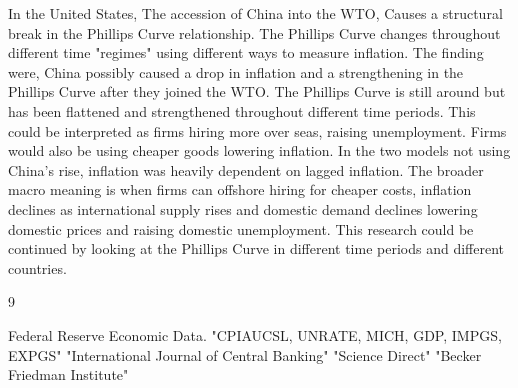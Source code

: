 \documentclass{article}
\begin{document}
In the United States, The accession of China into the WTO, Causes a structural break in the Phillips Curve relationship. The Phillips Curve changes throughout different time "regimes" using different ways to measure inflation. The finding were, China possibly caused a drop in inflation and a strengthening in the Phillips Curve after they joined the WTO. The Phillips Curve is still around but has been flattened and strengthened throughout different time periods. This could be interpreted as firms hiring more over seas, raising unemployment. Firms would also be using cheaper goods lowering inflation. In the two models not using China's rise, inflation was heavily dependent on lagged inflation. The broader macro meaning is when firms can offshore hiring for cheaper costs, inflation declines as international supply rises and domestic demand declines lowering domestic prices and raising domestic unemployment. This research could be continued by looking at the Phillips Curve in different time periods and different countries.

\begin{thebibliography}{9}

Federal Reserve Economic Data.
"CPIAUCSL, UNRATE, MICH, GDP, IMPGS, EXPGS"
"International Journal of Central Banking"
"Science Direct"
"Becker Friedman Institute"
\end{thebibliography}
\end{document}
